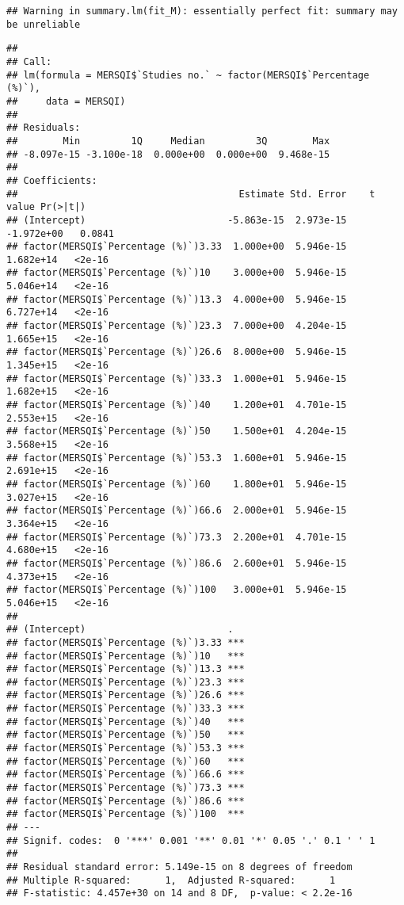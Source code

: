 \documentclass[]{article}
\begin{document}
\begin{verbatim}
## Warning in summary.lm(fit_M): essentially perfect fit: summary may be unreliable
\end{verbatim}

\begin{verbatim}
## 
## Call:
## lm(formula = MERSQI$`Studies no.` ~ factor(MERSQI$`Percentage (%)`), 
##     data = MERSQI)
## 
## Residuals:
##        Min         1Q     Median         3Q        Max 
## -8.097e-15 -3.100e-18  0.000e+00  0.000e+00  9.468e-15 
## 
## Coefficients:
##                                       Estimate Std. Error    t value Pr(>|t|)
## (Intercept)                         -5.863e-15  2.973e-15 -1.972e+00   0.0841
## factor(MERSQI$`Percentage (%)`)3.33  1.000e+00  5.946e-15  1.682e+14   <2e-16
## factor(MERSQI$`Percentage (%)`)10    3.000e+00  5.946e-15  5.046e+14   <2e-16
## factor(MERSQI$`Percentage (%)`)13.3  4.000e+00  5.946e-15  6.727e+14   <2e-16
## factor(MERSQI$`Percentage (%)`)23.3  7.000e+00  4.204e-15  1.665e+15   <2e-16
## factor(MERSQI$`Percentage (%)`)26.6  8.000e+00  5.946e-15  1.345e+15   <2e-16
## factor(MERSQI$`Percentage (%)`)33.3  1.000e+01  5.946e-15  1.682e+15   <2e-16
## factor(MERSQI$`Percentage (%)`)40    1.200e+01  4.701e-15  2.553e+15   <2e-16
## factor(MERSQI$`Percentage (%)`)50    1.500e+01  4.204e-15  3.568e+15   <2e-16
## factor(MERSQI$`Percentage (%)`)53.3  1.600e+01  5.946e-15  2.691e+15   <2e-16
## factor(MERSQI$`Percentage (%)`)60    1.800e+01  5.946e-15  3.027e+15   <2e-16
## factor(MERSQI$`Percentage (%)`)66.6  2.000e+01  5.946e-15  3.364e+15   <2e-16
## factor(MERSQI$`Percentage (%)`)73.3  2.200e+01  4.701e-15  4.680e+15   <2e-16
## factor(MERSQI$`Percentage (%)`)86.6  2.600e+01  5.946e-15  4.373e+15   <2e-16
## factor(MERSQI$`Percentage (%)`)100   3.000e+01  5.946e-15  5.046e+15   <2e-16
##                                        
## (Intercept)                         .  
## factor(MERSQI$`Percentage (%)`)3.33 ***
## factor(MERSQI$`Percentage (%)`)10   ***
## factor(MERSQI$`Percentage (%)`)13.3 ***
## factor(MERSQI$`Percentage (%)`)23.3 ***
## factor(MERSQI$`Percentage (%)`)26.6 ***
## factor(MERSQI$`Percentage (%)`)33.3 ***
## factor(MERSQI$`Percentage (%)`)40   ***
## factor(MERSQI$`Percentage (%)`)50   ***
## factor(MERSQI$`Percentage (%)`)53.3 ***
## factor(MERSQI$`Percentage (%)`)60   ***
## factor(MERSQI$`Percentage (%)`)66.6 ***
## factor(MERSQI$`Percentage (%)`)73.3 ***
## factor(MERSQI$`Percentage (%)`)86.6 ***
## factor(MERSQI$`Percentage (%)`)100  ***
## ---
## Signif. codes:  0 '***' 0.001 '**' 0.01 '*' 0.05 '.' 0.1 ' ' 1
## 
## Residual standard error: 5.149e-15 on 8 degrees of freedom
## Multiple R-squared:      1,  Adjusted R-squared:      1 
## F-statistic: 4.457e+30 on 14 and 8 DF,  p-value: < 2.2e-16
\end{verbatim}
\end{document}
